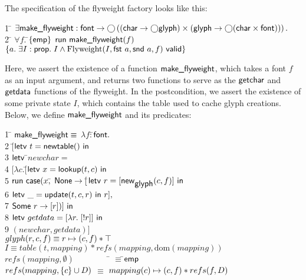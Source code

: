 \documentclass[preprint,natbib]{sigplanconf}
\begin{document}
The specification of the flyweight factory looks like this:
{\small
\begin{tabbing}
1 \qquad \= $\exists \mbox{\textsf{{make\_flyweight}}} :
\mbox{\textsf{{font}}} \to \bigcirc\left(\left(\mbox{\textsf{{char}}} \to \bigcirc{\mbox{\textsf{{glyph}}}}\right) \times
(\mbox{\textsf{{glyph}}} \to \bigcirc{(\mbox{\textsf{{char}}}\times \mbox{\textsf{{font}}})})\right).$\\
2 \> \;\;\= $\forall f.\;$\=$\{{\mathsf{emp}}\}$
  $\mbox{\textsf{{run }}}{\mbox{\textsf{{make\_flyweight}}}(f)}$ 
 $\{{a.\; \exists I:\mbox{\textsf{{prop}}}.\; I \land {\mbox{Flyweight}(I, \mbox{\textsf{{fst }}} a, \mbox{\textsf{{snd }}} a, f)}\mbox{\textsf{{ valid}}}}\}$ \\
\end{tabbing}
}
Here, we assert the existence of a function $\mbox{\textsf{{make\_flyweight}}}$,
which takes a font $f$ as an input argument, and returns two functions
to serve as the $\mbox{\textsf{{getchar}}}$ and $\mbox{\textsf{{getdata}}}$ functions of
the flyweight. In the postcondition, we assert the existence of some
private state $I$, which contains the table used to cache glyph
creations. Below, we define
$\mbox{\textsf{{make\_flyweight}}}$ and its predicates: {\small
\begin{tabbing}
1 \qquad \= $\mbox{\textsf{{m}}}\mbox{\textsf{{ake\_flyweight}}} \equiv$
       $\lambda f:$\=$\mbox{\textsf{{font}}}.\;$\\
2  \> \> $[$\=$\mbox{\textsf{{letv }}}t = \mbox{\textsf{{newtable}}}()\mbox{\textsf{{ in }}}$ \\
3  \> \> \> $\mbox{\textsf{{letv }}}$\=$newchar =$ \\
4  \> \> \> \> \!\!$[\lambda c.[$\=$\mbox{\textsf{{letv }}}x = \mbox{\textsf{{lookup}}}(t, c)\mbox{\textsf{{ in}}}$\\
5  \> \> \>\>\> $\mbox{\textsf{{run }}}\mbox{\textsf{{case}}}(x,$\=
$\mbox{\textsf{{None}}} \to [$\=$\mbox{\textsf{{letv }}} r = [\mbox{\textsf{{new}}}_{\mbox{\textsf{{glyph}}}} (c,f)] \mbox{\textsf{{ in}}}$\\
6  \> \> \>\>\>\>\> $\mbox{\textsf{{letv }}} \_ = \mbox{\textsf{{update}}}(t, c, r) \mbox{\textsf{{ in }}}r],$ \\
7 \> \> \>\>\>\> $\mbox{\textsf{{Some }}}r \to [r])] \mbox{\textsf{{ in}}}$ \\
8 \> \> \> $\mbox{\textsf{{letv }}}getdata = [\lambda r.\; [!r]] \mbox{\textsf{{ in}}}$ \\
9 \> \> \> $(newchar, getdata)]$
\\[0.5em]

$glyph(r, c, f) \equiv r \mapsto (c,f) * \top$ \\[0.5em]

$I \equiv table(t,mapping) * refs(mapping, \mbox{dom}(mapping))$ \\[0.5em]

$refs(mapping, \emptyset) \qquad\qquad  $ \= $\equiv$\;\;\=$\mathsf{emp}$ \\
$refs(mapping, \{{c}\} \cup D)$ \> $\equiv$\> $mapping(c) \mapsto (c,f) * refs(f, D)$ \\
 
\end{tabbing}
}
\end{document}
